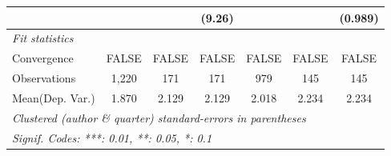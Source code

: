 \begin{tabular}{lcccccc}
                           &              &         & (9.26)        &              &         & (0.989)\\   
   \midrule
   \emph{Fit statistics}\\
   Convergence             &FALSE         & FALSE   & FALSE         & FALSE        & FALSE   & FALSE\\  
   Observations            & 1,220        & 171     & 171           & 979          & 145     & 145\\  
Mean(Dep. Var.) & 1.870 & 2.129 & 2.129 & 2.018 & 2.234 & 2.234 \\
   \midrule \midrule
   \multicolumn{7}{l}{\emph{Clustered (author \& quarter) standard-errors in parentheses}}\\
   \multicolumn{7}{l}{\emph{Signif. Codes: ***: 0.01, **: 0.05, *: 0.1}}\\
\end{tabular}
\par\endgroup
